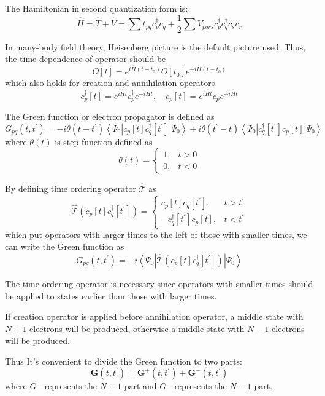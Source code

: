 \documentclass[bachelor, english]{ustcthesis}
\begin{document}
The Hamiltonian in second quantization form is:
$$
\hat{H}=\hat{T}+\hat{V}=\sum t_{p q} c_{p}^{\dagger} c_{q}+\frac{1}{2} \sum V_{p q r s} c_{p}^{\dagger} c_{q}^{\dagger} c_{s} c_{r}
$$

In many-body field theory, Heisenberg picture is the default picture used.
Thus, the time dependence of operator should be
$$
O[t]=e^{i \hat{H} (t-t_0)} O[t_0] e^{-i \hat{H} (t-t_0)}
$$
which also holds for creation and annihilation operators
$$
c_{p}^{\dagger}[t]=e^{i \hat{H} t} c_{p}^{\dagger} e^{-i \hat{H} t}, \quad c_{p}[t]=e^{i \hat{H} t} c_{p} e^{-i \hat{H} t}
$$

The Green function or electron propagator is defined as
$$
G_{p q}\left(t, t^{\prime}\right)=-i \theta\left(t-t^{\prime}\right)\left\langle\Psi_{0}\left|c_{p}[t] c_{q}^{\dagger}\left[t^{\prime}\right]\right| \Psi_{0}\right\rangle+ i \theta\left(t^{\prime}-t\right)\left\langle\Psi_{0}\left|c_{q}^{\dagger}\left[t^{\prime}\right] c_{p}[t]\right| \Psi_{0}\right\rangle
$$
where $\theta(t)$ is step function defined as
$$
\theta(t)=\left\{\begin{array}{ll}{1,} & {t>0} \\ {0,} & {t<0}\end{array}\right.
$$

By defining time ordering operator $\hat{\mathcal{T}}$ as
$$
\hat{\mathcal{T}}\left(c_{p}[t] c_{q}^{\dagger}\left[t^{\prime}\right]\right)=\left\{\begin{array}{cc}{c_{p}[t] c_{q}^{\dagger}\left[t^{\prime}\right],} & {t>t^{\prime}} \\ {-c_{q}^{\dagger}\left[t^{\prime}\right] c_{p}[t],} & {t<t^{\prime}}\end{array}\right.
$$
which put operators with larger times to the left of those with smaller times,
we can write the Green function as
$$
G_{p q}\left(t, t^{\prime}\right)=-i\left\langle\Psi_{0}\left|\hat{\mathcal{T}}\left(c_{p}[t] c_{q}^{\dagger}\left[t^{\prime}\right]\right)\right| \Psi_{0}\right\rangle
$$

The time ordering operator is necessary since operators with smaller times should be applied to states earlier than those with larger times.

If creation operator is applied before annihilation operator, a middle state with $N+1$ electrons will be produced, otherwise a middle state with $N-1$ electrons will be produced.

Thus It's convenient to divide the Green function to two parts:
$$
\boldsymbol{G}\left(t, t^{\prime}\right)=\boldsymbol{G}^{+}\left(t, t^{\prime}\right)+\boldsymbol{G}^{-}\left(t, t^{\prime}\right)
$$
where $G^{+}$ represents the $N+1$ part and $G^{-}$ represents the $N-1$ part.
\end{document}
